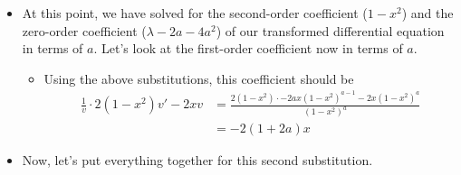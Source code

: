 \documentclass[../finalProject.tex]{subfiles}
\begin{document}
\begin{itemize}
\begin{itemize}
        \item At this point, we have solved for the second-order coefficient ($1-x^2$) and the zero-order coefficient ($\lambda-2a-4a^2$) of our transformed differential equation in terms of $a$. Let's look at the first-order coefficient now in terms of $a$.
        \begin{itemize}
            \item Using the above substitutions, this coefficient should be
            \begin{align*}
                \frac{1}{v}\cdot 2(1-x^2)v'-2xv &= \frac{2(1-x^2)\cdot -2ax(1-x^2)^{a-1}-2x(1-x^2)^a}{(1-x^2)^a}\\
                &= -2(1+2a)x
            \end{align*}
        \end{itemize}
        \item Now, let's put everything together for this second substitution.

\end{itemize}
\end{itemize}
\end{document}
